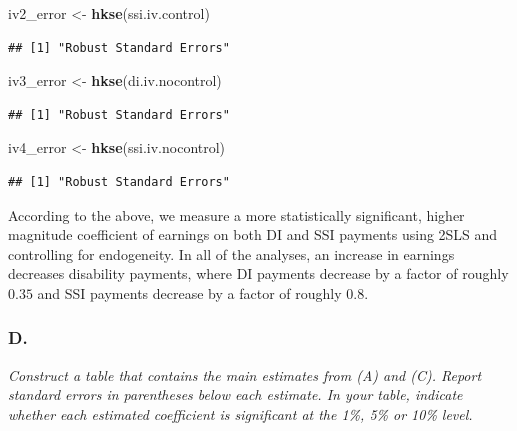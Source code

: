 \documentclass[
]{article}
\newenvironment{Shaded}{\begin{snugshade}}{\end{snugshade}}
\newcommand{\KeywordTok}[1]{\textcolor[rgb]{0.13,0.29,0.53}{\textbf{#1}}}
\newcommand{\NormalTok}[1]{#1}
\newcommand{\StringTok}[1]{\textcolor[rgb]{0.31,0.60,0.02}{#1}}
\begin{document}
\begin{Shaded}
\begin{Highlighting}[]
\NormalTok{iv2_error <-}\StringTok{ }\KeywordTok{hkse}\NormalTok{(ssi.iv.control)}
\end{Highlighting}
\end{Shaded}

\begin{verbatim}
## [1] "Robust Standard Errors"
\end{verbatim}

\begin{Shaded}
\begin{Highlighting}[]
\NormalTok{iv3_error <-}\StringTok{ }\KeywordTok{hkse}\NormalTok{(di.iv.nocontrol)}
\end{Highlighting}
\end{Shaded}

\begin{verbatim}
## [1] "Robust Standard Errors"
\end{verbatim}

\begin{Shaded}
\begin{Highlighting}[]
\NormalTok{iv4_error <-}\StringTok{ }\KeywordTok{hkse}\NormalTok{(ssi.iv.nocontrol)}
\end{Highlighting}
\end{Shaded}

\begin{verbatim}
## [1] "Robust Standard Errors"
\end{verbatim}

According to the above, we measure a more statistically significant,
higher magnitude coefficient of earnings on both DI and SSI payments
using 2SLS and controlling for endogeneity. In all of the analyses, an
increase in earnings decreases disability payments, where DI payments
decrease by a factor of roughly \(0.35\) and SSI payments decrease by a
factor of roughly \(0.8\).

\hypertarget{d.-4}{%
\subsubsection{D.}\label{d.-4}}

\emph{Construct a table that contains the main estimates from (A) and
(C). Report standard errors in parentheses below each estimate. In your
table, indicate whether each estimated coefficient is significant at the
1\%, 5\% or 10\% level.}
\end{document}
